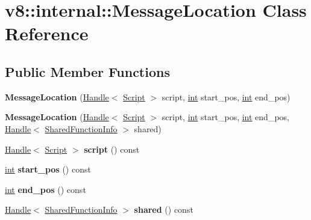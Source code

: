 \hypertarget{classv8_1_1internal_1_1MessageLocation}{}\section{v8\+:\+:internal\+:\+:Message\+Location Class Reference}
\label{classv8_1_1internal_1_1MessageLocation}
\subsection*{Public Member Functions}
\begin{DoxyCompactItemize}
\item 
\mbox{\label{classv8_1_1internal_1_1MessageLocation_ab3acbbdff769f414fbae9f269e805e06}} 
{\bfseries Message\+Location} (\mbox{\hyperlink{classv8_1_1internal_1_1Handle}{Handle}}$<$ \mbox{\hyperlink{classv8_1_1internal_1_1Script}{Script}} $>$ script, \mbox{\hyperlink{classint}{int}} start\+\_\+pos, \mbox{\hyperlink{classint}{int}} end\+\_\+pos)
\item 
\mbox{\label{classv8_1_1internal_1_1MessageLocation_a0dae422921ba4b2eccf273469ab2caaa}} 
{\bfseries Message\+Location} (\mbox{\hyperlink{classv8_1_1internal_1_1Handle}{Handle}}$<$ \mbox{\hyperlink{classv8_1_1internal_1_1Script}{Script}} $>$ script, \mbox{\hyperlink{classint}{int}} start\+\_\+pos, \mbox{\hyperlink{classint}{int}} end\+\_\+pos, \mbox{\hyperlink{classv8_1_1internal_1_1Handle}{Handle}}$<$ \mbox{\hyperlink{classv8_1_1internal_1_1SharedFunctionInfo}{Shared\+Function\+Info}} $>$ shared)
\item 
\mbox{\label{classv8_1_1internal_1_1MessageLocation_af15b313409775c3e0bb33969a6b5d8ab}} 
\mbox{\hyperlink{classv8_1_1internal_1_1Handle}{Handle}}$<$ \mbox{\hyperlink{classv8_1_1internal_1_1Script}{Script}} $>$ {\bfseries script} () const
\item 
\mbox{\label{classv8_1_1internal_1_1MessageLocation_a35043f30904b9cfda84ef2d323d19d9e}} 
\mbox{\hyperlink{classint}{int}} {\bfseries start\+\_\+pos} () const
\item 
\mbox{\label{classv8_1_1internal_1_1MessageLocation_a3fb9244007c976eb06b9b408ab8c9474}} 
\mbox{\hyperlink{classint}{int}} {\bfseries end\+\_\+pos} () const
\item 
\mbox{\label{classv8_1_1internal_1_1MessageLocation_a71dbddf68b25515b1c9663d27171b78e}} 
\mbox{\hyperlink{classv8_1_1internal_1_1Handle}{Handle}}$<$ \mbox{\hyperlink{classv8_1_1internal_1_1SharedFunctionInfo}{Shared\+Function\+Info}} $>$ {\bfseries shared} () const
\end{DoxyCompactItemize}


